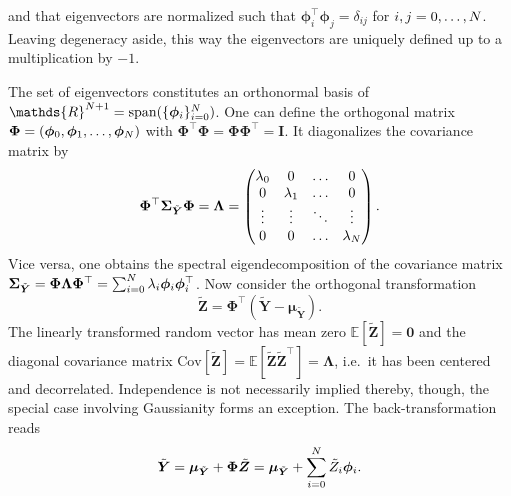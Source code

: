 and that eigenvectors are normalized such that \(\bm{\phi}_i^\top \bm{\phi}_j = \delta_{ij}\) for \(i,j=0,\ldots,N\).
Leaving degeneracy aside, this way the eigenvectors are uniquely defined up to a multiplication by \(-1\).
\par %
The set of eigenvectors constitutes an orthonormal basis of \(\mathds{R}^{\dimData+1} = \mathrm{span}(\{\bm{\phi}_i\}_{i=0}^\dimData)\).
One can define the orthogonal matrix \(\bm{\Phi} = (\bm{\phi}_0,\bm{\phi}_1,\ldots,\bm{\phi}_N)\)
with \(\bm{\Phi}^\top \bm{\Phi} = \bm{\Phi} \bm{\Phi}^\top = \bm{I}\).
It diagonalizes the covariance matrix by
\begin{equation} \label{eq:Hydro:Diagonaliztaion}
  \bm{\Phi}^\top \bm{\Sigma}_{\tilde{\bm{Y}}} \bm{\Phi}
  = \bm{\Lambda} = \begin{pmatrix}
                     \lambda_0 & 0 & \ldots & 0 \\
                     0 & \lambda_1 & \ldots & 0 \\
                     \vdots & \vdots & \ddots & \vdots \\
                     0 & 0 & \ldots & \lambda_N \\
                   \end{pmatrix}.
\end{equation}
Vice versa, one obtains the spectral eigendecomposition of the covariance matrix
\(\bm{\Sigma}_{\tilde{\bm{Y}}} = \bm{\Phi} \bm{\Lambda} \bm{\Phi}^\top = \sum_{i=0}^N \lambda_i \bm{\phi}_i \bm{\phi}_i^\top\).
Now consider the orthogonal transformation
\begin{equation} \label{eq:Hydro:LinearTransformation}
  \tilde{\bm{Z}} = \bm{\Phi}^\top (\tilde{\bm{Y}} - \bm{\mu}_{\tilde{\bm{Y}}}).
\end{equation}
The linearly transformed random vector has mean zero \(\mathds{E}[\tilde{\bm{Z}}] = \bm{0}\)
and the diagonal covariance matrix \(\mathrm{Cov}[\tilde{\bm{Z}}] = \mathds{E}[\tilde{\bm{Z}} \tilde{\bm{Z}}^\top] = \bm{\Lambda}\), i.e.\ it has been centered and decorrelated.
Independence is not necessarily implied thereby, though, the special case involving Gaussianity forms an exception.
The back-transformation reads
\begin{equation} \label{eq:Hydro:BackTransformation}
  \tilde{\bm{Y}} = \bm{\mu}_{\tilde{\bm{Y}}} + \bm{\Phi} \tilde{\bm{Z}} = \bm{\mu}_{\tilde{\bm{Y}}} + \sum\limits_{i=0}^N \tilde{Z}_i \bm{\phi}_i.
\end{equation}

